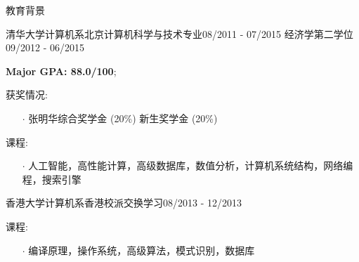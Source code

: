 \documentclass{resume} %
\begin{document}
\vspace{-1.5em}
\begin{rSection}{教育背景}
\begin{eSubsection}{清华大学计算机系}{北京}{计算机科学与技术专业}{08/2011 - 07/2015}
{经济学第二学位}{09/2012 - 06/2015}
\item \textbf{Major GPA: 88.0/100};
\item 获奖情况:
\begin{itemize}
\itemsep -0.5em \vspace{-0.5em}
\item[$\cdot$] 张明华综合奖学金 (20\%) 新生奖学金 (20\%)
\end{itemize}
\item 课程:
	\begin{itemize}
	\itemsep -0.5em \vspace{-0.5em}
	\item[$\cdot$] 人工智能，高性能计算，高级数据库，数值分析，计算机系统结构，网络编程，搜索引擎
	\end{itemize}
\end{eSubsection}
\vspace{-0.8em}
\begin{rSubsection}{香港大学计算机系}{香港}{校派交换学习}{08/2013 - 12/2013}
\item 课程:
	\begin{itemize}
	\itemsep -0.5em \vspace{-0.5em}
	\item[$\cdot$] 编译原理，操作系统，高级算法，模式识别，数据库
	\end{itemize}
\end{rSubsection}
\end{rSection}
\vspace{-1.0em}
\end{document}
